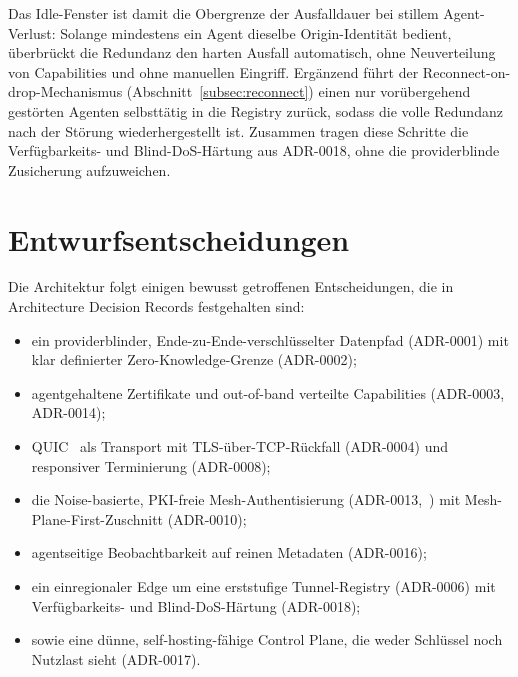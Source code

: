 Das Idle-Fenster ist damit die Obergrenze der Ausfalldauer bei stillem
Agent-Verlust: Solange mindestens ein Agent dieselbe Origin-Identität bedient,
überbrückt die Redundanz den harten Ausfall automatisch, ohne Neuverteilung von
Capabilities und ohne manuellen Eingriff. Ergänzend führt der
Reconnect-on-drop-Mechanismus (Abschnitt~\ref{subsec:reconnect}) einen nur
vorübergehend gestörten Agenten selbsttätig in die Registry zurück, sodass die
volle Redundanz nach der Störung wiederhergestellt ist. Zusammen tragen diese
Schritte die Verfügbarkeits- und Blind-DoS-Härtung aus ADR-0018, ohne die
providerblinde Zusicherung aufzuweichen.

\section{Entwurfsentscheidungen}
\label{sec:entscheidungen}

Die Architektur folgt einigen bewusst getroffenen Entscheidungen, die in
Architecture Decision Records festgehalten sind:

\begin{itemize}
  \item ein providerblinder, Ende-zu-Ende-verschlüsselter Datenpfad (ADR-0001)
    mit klar definierter Zero-Knowledge-Grenze (ADR-0002);
  \item agentgehaltene Zertifikate und out-of-band verteilte Capabilities
    (ADR-0003, ADR-0014);
  \item QUIC~\cite{rfc9000,rfc9001} als Transport mit TLS-über-TCP-Rückfall
    (ADR-0004) und responsiver Terminierung (ADR-0008);
  \item die Noise-basierte, PKI-freie Mesh-Authentisierung
    (ADR-0013,~\cite{noiseprotocol}) mit Mesh-Plane-First-Zuschnitt (ADR-0010);
  \item agentseitige Beobachtbarkeit auf reinen Metadaten (ADR-0016);
  \item ein einregionaler Edge um eine erststufige Tunnel-Registry (ADR-0006)
    mit Verfügbarkeits- und Blind-DoS-Härtung (ADR-0018);
  \item sowie eine dünne, self-hosting-fähige Control Plane, die weder Schlüssel
    noch Nutzlast sieht (ADR-0017).
\end{itemize}

